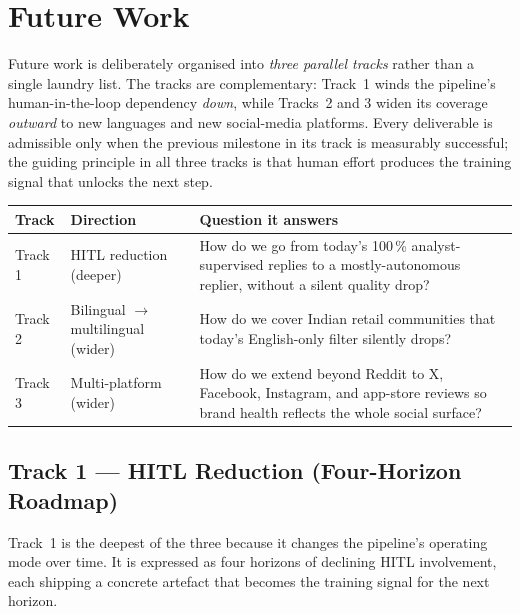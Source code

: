 \chapter{Future Work}\label{ch:future}

Future work is deliberately organised into \emph{three parallel tracks}
rather than a single laundry list.  The tracks are complementary:
Track~1 winds the pipeline's human-in-the-loop dependency \emph{down},
while Tracks~2 and 3 widen its coverage \emph{outward} to new languages
and new social-media platforms.  Every deliverable is admissible only
when the previous milestone in its track is measurably successful; the
guiding principle in all three tracks is that human effort produces the
training signal that unlocks the next step.

\begin{center}
\small
\begin{tabularx}{\linewidth}{@{}p{2.4cm} p{2.6cm} X@{}}
\toprule
\textbf{Track} & \textbf{Direction} & \textbf{Question it answers} \\
\midrule
Track 1 & HITL reduction (deeper) &
How do we go from today's 100\,\% analyst-supervised replies to a
mostly-autonomous replier, without a silent quality drop? \\
Track 2 & Bilingual $\to$ multilingual (wider) &
How do we cover Indian retail communities that today's English-only
filter silently drops? \\
Track 3 & Multi-platform (wider) &
How do we extend beyond Reddit to X, Facebook, Instagram, and
app-store reviews so brand health reflects the whole social surface? \\
\bottomrule
\end{tabularx}
\end{center}

\section{Track 1 --- HITL Reduction (Four-Horizon Roadmap)}\label{sec:future:hitl}

Track~1 is the deepest of the three because it changes the pipeline's
operating mode over time.  It is expressed as four horizons of
declining HITL involvement, each shipping a concrete artefact that
becomes the training signal for the next horizon.


